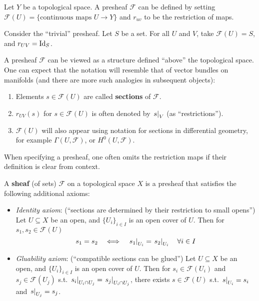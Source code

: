 \documentclass{article}
\begin{document}
\begin{example}\label{ex: presheaf ex1}
    Let $Y$ be a topological space. A presheaf $\mathcal{F}$ can be defined by setting $\mathcal{F}(U) = \{ \text{continuous maps } U \to Y \}$ and $r_{uv}$ to be the restriction of maps.
\end{example}
\nogap
\begin{example}\label{ex: presheaf ex2}
    Consider the ``trivial'' presheaf. Let $S$ be a set. For all $U$ and $V$, take $\mathcal{F}(U) = S$, and $r_{UV} = \mathrm{Id}_S$.
\end{example}

\begin{notation}
    A presheaf $\mathcal{F}$ can be viewed as a structure defined ``above'' the topological space. One can expect that the notation will resemble that of vector bundles on manifolds (and there are more such analogies in subsequent objects):
    \begin{enumerate}
        \item Elements $s \in \mathcal{F}(U)$ are called \textbf{sections} of $\mathcal{F}$.
        \item $r_{UV}(s)$ for $s \in \mathcal{F}(U)$ is often denoted by $\left.s\right|_{V}$ (as ``restrictions'').
        \item $\mathcal{F}(U)$ will also appear using notation for sections in differential geometry, for example $\Gamma(U, \mathcal{F})$, or $H^0(U, \mathcal{F}) $.
    \end{enumerate} 
    When specifying a presheaf, one often omits the restriction maps if their definition is clear from context.
\end{notation}

\begin{definition}[Sheaf]
    A \textbf{sheaf} (of sets) $\mathcal{F}$ on a topological space $X$ is a presheaf that satisfies the following additional axioms:
    \begin{itemize}
        \item \emph{Identity axiom}: (``sections are determined by their restriction to small opens'') Let $U \subseteq X$ be an open, and $\{ U_i \}_{i \in I}$ is an open cover of $U$. Then for $s_1, s_2 \in \mathcal{F}(U)$
        \[
            s_1 = s_2
            \quad \Longleftrightarrow \quad
            \left.s_1\right|_{U_i} = \left.s_2\right|_{U_i} \quad \forall i \in I
        \]
        \item \emph{Gluability axiom}: (``compatible sections can be glued'') Let $U \subseteq X$ be an open, and $\{ U_i \}_{i \in I}$ is an open cover of $U$. Then for $s_i \in \mathcal{F}(U_i)$ and $s_j \in \mathcal{F}(U_j)$ s.t. $\left.s_i\right|_{U_i \cap U_j} = \left.s_j\right|_{U_i \cap U_j}$, there exists $s \in \mathcal{F}(U)$ s.t. $\left.s\right|_{U_i} = s_i$ and $\left.s\right|_{U_j} = s_j$.
    \end{itemize}
\end{definition}
\end{document}
